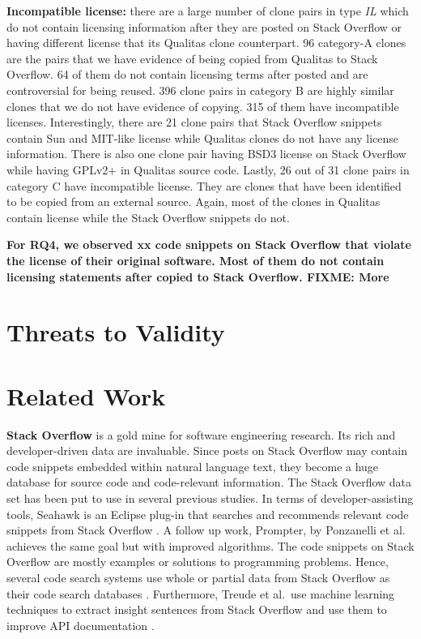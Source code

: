 \documentclass[sigconf,review, anonymous]{acmart}
\newcommand\FIXME[1]{\textbf{FIXME: #1}}
\begin{document}
\textbf{Incompatible license:} there are a large number of clone pairs in type \textit{IL} which do not contain licensing information after they are posted on Stack Overflow or having different license that its Qualitas clone counterpart. 96 category-A clones are the pairs that we have evidence of being copied from Qualitas to Stack Overflow. 64 of them do not contain licensing terms after posted and are controversial for being reused. 396 clone pairs in category B are highly similar clones that we do not have evidence of copying. 315 of them have incompatible licenses. Interestingly, there are 21 clone pairs that Stack Overflow snippets contain Sun and MIT-like license while Qualitas clones do not have any license information. There is also one clone pair having BSD3 license on Stack Overflow while having GPLv2+ in Qualitas source code. Lastly, 26 out of 31 clone pairs in category C have incompatible license. They are clones that have been identified to be copied from an external source. Again, most of the clones in Qualitas contain license while the Stack Overflow snippets do not. 

\textbf{For RQ4, we observed xx code snippets on Stack Overflow that violate the license of their original software. Most of them do not contain licensing statements after copied to Stack Overflow. \FIXME{More}}

\section{Threats to Validity}

\section{Related Work}

\textbf{Stack Overflow} is a gold mine for software engineering research. Its rich and developer-driven data are invaluable. Since posts on Stack Overflow may contain code snippets embedded within natural language text, they become a huge database for source code and code-relevant information. The Stack Overflow data set has been put to use in several previous studies. In terms of developer-assisting tools, Seahawk is an Eclipse plug-in that searches and recommends relevant code snippets from Stack Overflow \cite{Ponzanelli2013}. A follow up work, Prompter, by Ponzanelli et al.~\cite{Ponzanelli2014} achieves the same goal but with improved algorithms. The code snippets on Stack Overflow are mostly examples or solutions to programming problems. Hence, several code search systems use whole or partial data from Stack Overflow as their code search databases \cite{Diamantopoulos2015,Keivanloo2014,Park2014, Stolee2014,Subramanian2013,Diamantopoulos2015}. Furthermore, Treude et al.~use machine learning techniques to extract insight sentences from Stack Overflow and use them to improve API documentation \cite{Treude2016}.
\end{document}
